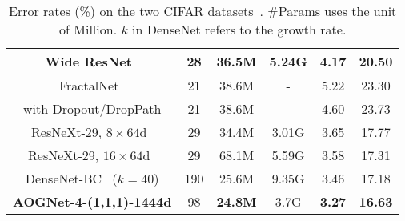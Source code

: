 \documentclass[10pt,twocolumn,letterpaper]{article}
\begin{document}
\begin{table}[t]
{{\begin{tabular}{c|ccc|cc}
        Wide ResNet~\cite{WideResNet} & 28 & 36.5M & 5.24G & 4.17 & 20.50 \\ \hline
        FractalNet~\cite{FractalNet} & 21 & 38.6M &- & 5.22 & 23.30 \\
        with Dropout/DropPath & 21 & 38.6M &- & 4.60 & 23.73 \\ \hline
        ResNeXt-29, $8\times64$d~\cite{ResNeXt} & 29 & 34.4M & 3.01G & 3.65 & 17.77 \\ 
        ResNeXt-29, $16\times64$d~\cite{ResNeXt} & 29 & 68.1M & 5.59G & 3.58 & 17.31 \\ \hline
		
		DenseNet-BC~\cite{DenseNet} ($k = 40$) & 190 & 25.6M & 9.35G & 3.46 & 17.18 \\ \hline
		\textbf{AOGNet-4-(1,1,1)-1444d} & 98 & \textbf{24.8M} & 3.7G & \textbf{3.27} & \textbf{16.63} \\ \hline 
        \end{tabular} 
        } 
        }
        \\ [1ex]
        \caption{Error rates (\%) on the two CIFAR datasets~\cite{CIFAR}. \#Params uses the unit of Million. $k$ in DenseNet refers to the growth rate. %
        }\label{table:cifar-results} 
    \end{table}
    
\end{document}
